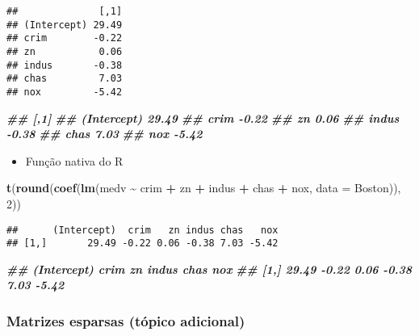 \documentclass[
]{article}
\newenvironment{Shaded}{\begin{snugshade}}{\end{snugshade}}
\newcommand{\AttributeTok}[1]{\textcolor[rgb]{0.13,0.29,0.53}{#1}}
\newcommand{\DecValTok}[1]{\textcolor[rgb]{0.00,0.00,0.81}{#1}}
\newcommand{\DocumentationTok}[1]{\textcolor[rgb]{0.56,0.35,0.01}{\textbf{\textit{#1}}}}
\newcommand{\FunctionTok}[1]{\textcolor[rgb]{0.13,0.29,0.53}{\textbf{#1}}}
\newcommand{\NormalTok}[1]{#1}
\newcommand{\SpecialCharTok}[1]{\textcolor[rgb]{0.81,0.36,0.00}{\textbf{#1}}}
\providecommand{\tightlist}{%
  \setlength{\itemsep}{0pt}\setlength{\parskip}{0pt}}
\begin{document}
\begin{verbatim}
##              [,1]
## (Intercept) 29.49
## crim        -0.22
## zn           0.06
## indus       -0.38
## chas         7.03
## nox         -5.42
\end{verbatim}

\begin{Shaded}
\begin{Highlighting}[]
\DocumentationTok{\#\# [,1]}
\DocumentationTok{\#\# (Intercept) 29.49}
\DocumentationTok{\#\# crim {-}0.22}
\DocumentationTok{\#\# zn 0.06}
\DocumentationTok{\#\# indus {-}0.38}
\DocumentationTok{\#\# chas 7.03}
\DocumentationTok{\#\# nox {-}5.42}
\end{Highlighting}
\end{Shaded}

\begin{itemize}
\tightlist
\item
  Função nativa do R
\end{itemize}

\begin{Shaded}
\begin{Highlighting}[]
\FunctionTok{t}\NormalTok{(}\FunctionTok{round}\NormalTok{(}\FunctionTok{coef}\NormalTok{(}\FunctionTok{lm}\NormalTok{(medv }\SpecialCharTok{\textasciitilde{}}\NormalTok{ crim }\SpecialCharTok{+}\NormalTok{ zn }\SpecialCharTok{+}\NormalTok{ indus }\SpecialCharTok{+}\NormalTok{ chas }\SpecialCharTok{+}\NormalTok{ nox, }\AttributeTok{data =}\NormalTok{ Boston)), }\DecValTok{2}\NormalTok{))}
\end{Highlighting}
\end{Shaded}

\begin{verbatim}
##      (Intercept)  crim   zn indus chas   nox
## [1,]       29.49 -0.22 0.06 -0.38 7.03 -5.42
\end{verbatim}

\begin{Shaded}
\begin{Highlighting}[]
\DocumentationTok{\#\# (Intercept) crim zn indus chas nox}
\DocumentationTok{\#\# [1,] 29.49 {-}0.22 0.06 {-}0.38 7.03 {-}5.42}
\end{Highlighting}
\end{Shaded}

\hypertarget{matrizes-esparsas-tuxf3pico-adicional}{%
\subsubsection{Matrizes esparsas (tópico
adicional)}\label{matrizes-esparsas-tuxf3pico-adicional}}
\end{document}
